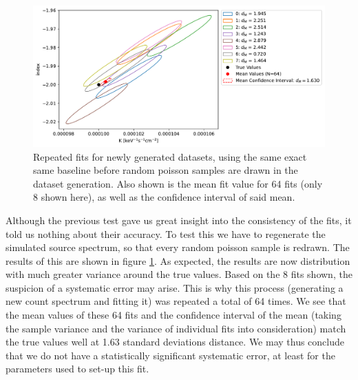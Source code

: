 \documentclass{report}
\begin{document}
\begin{figure}[h]
  \centering
  \includegraphics[width=\textwidth]{Images/Pure_Simulation/combined_plot_repeated_identical_new_gen.pdf}
  \caption{Repeated fits for newly generated datasets, using the same exact same baseline before random poisson samples are drawn in the dataset generation. Also shown is the mean fit value for 64 fits (only 8 shown here), as well as the confidence interval of said mean.}
  \label{fig ident new gen}
\end{figure}

Although the previous test gave us great insight into the consistency of the fits, it told us nothing about their accuracy. To test this we have to regenerate the simulated source spectrum, so that every random poisson sample is redrawn. The results of this are shown in figure \ref{fig ident new gen}. As expected, the results are now distribution with much greater variance around the true values. Based on the 8 fits shown, the suspicion of a systematic error may arise. This is why this process (generating a new count spectrum and fitting it) was repeated a total of 64 times. We see that the mean values of these 64 fits and the confidence interval of the mean (taking the sample variance and the variance of individual fits into consideration) match the true values well at 1.63 standard deviations distance. We may thus conclude that we do not have a statistically significant systematic error, at least for the parameters used to set-up this fit.
\end{document}
